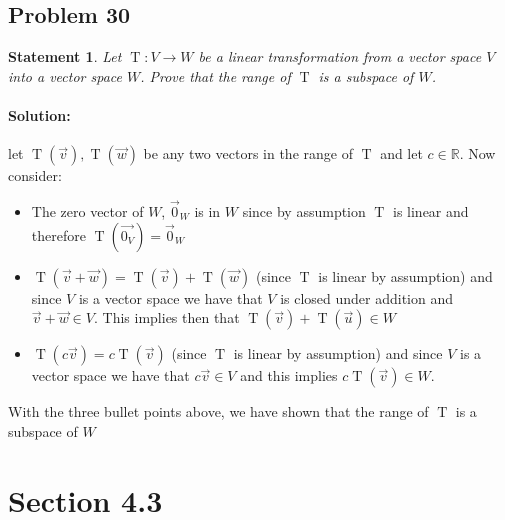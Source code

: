 \documentclass[12pt, letterpaper]{article}
\newcommand{\R}{\mathbb{R}}
\theoremstyle{statement}
\theoremstyle{statement}
\newtheorem*{atmStat}{Statement}
\newenvironment{Solution}{\noindent\ignorespaces\paragraph{Solution:}}{\hfill \ding{122}\par\noindent}
\newcommand{\func}[2]{\operatorname{#1}(#2)}
\newcommand{\trans}[2]{\func{#1}{\Vec{#2}}}
\begin{document}
    \subsection*{Problem 30}
    \begin{atmStat}
    Let $\operatorname{T}:V\longrightarrow W$ be a linear transformation from a vector space $V$ into a vector space $W$. Prove that the range of $\operatorname{T}$ is a subspace of $W$.
    \end{atmStat}
    \begin{Solution}
    let $\trans{T}{v}, \trans{T}{w}$ be any two vectors in the range of $\operatorname{T}$ and let $c \in \R$. Now consider:
    \begin{itemize}
        \item The zero vector of $W$, $\Vec{0}_W$ is in $W$ since by assumption $\operatorname{T}$ is linear and therefore $\trans{T}{0_V}=\Vec{0}_W$ 
        \item
        $\func{T}{\Vec{v}+\Vec{w}}=\trans{T}{v}+\trans{T}{w}$ (since $\operatorname{T}$ is linear by assumption) and since $V$ is a vector space we have that $V$ is closed under addition and $\Vec{v}+\Vec{w} \in V$. This implies then that $\trans{T}{v}+\trans{T}{u} \in W$
        \item $\func{T}{c\Vec{v}}=c\trans{T}{v}$ (since $\operatorname{T}$ is linear by assumption) and since $V$ is a vector space we have that $c\Vec{v} \in V$ and this implies $c\trans{T}{v} \in W$.
    \end{itemize}
    With the three bullet points above, we have shown that the range of $\operatorname{T}$ is a subspace of $W$
    \end{Solution}
    
    \section*{Section 4.3}
\end{document}
